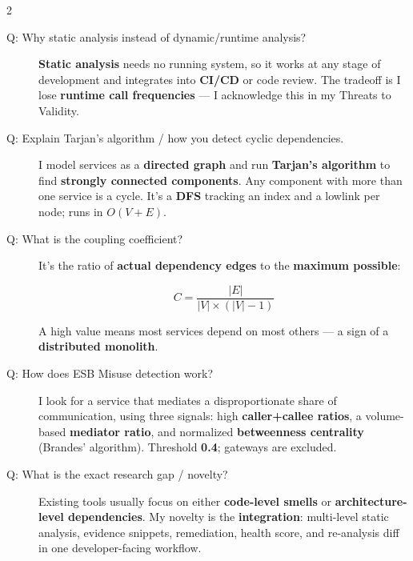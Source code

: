 \documentclass[10pt,a4paper]{article}
\begin{document}
\begin{multicols}{2}
\begin{description}
    \item[Q: Why static analysis instead of dynamic/runtime analysis?]
    \textbf{Static analysis} needs no running system, so it works at any stage of development and integrates into \textbf{CI/CD} or code review. The tradeoff is I lose \textbf{runtime call frequencies} --- I acknowledge this in my Threats to Validity.


    \item[Q: Explain Tarjan's algorithm / how you detect cyclic dependencies.]
    I model services as a \textbf{directed graph} and run \textbf{Tarjan's algorithm} to find \textbf{strongly connected components}. Any component with more than one service is a cycle. It's a \textbf{DFS} tracking an index and a lowlink per node; runs in  \(O(V+E)\).

    \item[Q: What is the coupling coefficient?]
    It's the ratio of \textbf{actual dependency edges} to the \textbf{maximum possible}:

    $$C = \frac{|E|}{|V| \times (|V| - 1)}$$

    A high value means most services depend on most others --- a sign of a \textbf{distributed monolith}.

    \item[Q: How does ESB Misuse detection work?]
    I look for a service that mediates a disproportionate share of communication, using three signals: high \textbf{caller+callee ratios}, a volume-based \textbf{mediator ratio}, and normalized \textbf{betweenness centrality} (Brandes' algorithm). Threshold \textbf{0.4}; gateways are excluded.

    \item[Q: What is the exact research gap / novelty?]
    Existing tools usually focus on either \textbf{code-level smells} or \textbf{architecture-level dependencies}. My novelty is the \textbf{integration}: multi-level static analysis, evidence snippets, remediation, health score, and re-analysis diff in one developer-facing workflow.


\end{description}
\end{multicols}
\end{document}
